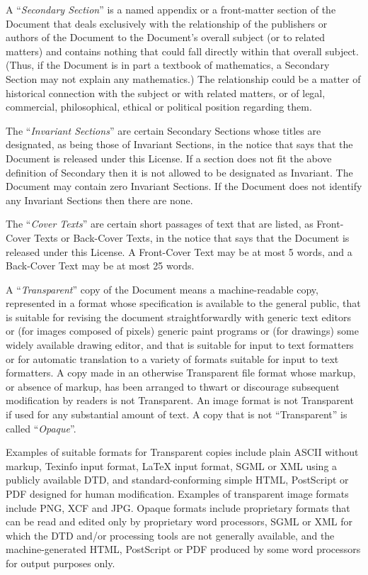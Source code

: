 \documentclass[a4paper,openany]{book}
\begin{document}
\begin{results}
A ``\emph{Secondary Section}'' is a named appendix or a front-matter section of
the Document that deals exclusively with the relationship of the
publishers or authors of the Document to the Document's overall subject
(or to related matters) and contains nothing that could fall directly
within that overall subject. (Thus, if the Document is in part a
textbook of mathematics, a Secondary Section may not explain any
mathematics.) The relationship could be a matter of historical
connection with the subject or with related matters, or of legal,
commercial, philosophical, ethical or political position regarding
them.

The ``\emph{Invariant Sections}'' are certain Secondary Sections whose titles
are designated, as being those of Invariant Sections, in the notice
that says that the Document is released under this License. If a
section does not fit the above definition of Secondary then it is not
allowed to be designated as Invariant. The Document may contain zero
Invariant Sections. If the Document does not identify any Invariant
Sections then there are none.

The ``\emph{Cover Texts}'' are certain short passages of text that are listed,
as Front-Cover Texts or Back-Cover Texts, in the notice that says that
the Document is released under this License. A Front-Cover Text may
be at most 5 words, and a Back-Cover Text may be at most 25 words.

A ``\emph{Transparent}'' copy of the Document means a machine-readable copy,
represented in a format whose specification is available to the
general public, that is suitable for revising the document
straightforwardly with generic text editors or (for images composed of
pixels) generic paint programs or (for drawings) some widely available
drawing editor, and that is suitable for input to text formatters or
for automatic translation to a variety of formats suitable for input
to text formatters. A copy made in an otherwise Transparent file
format whose markup, or absence of markup, has been arranged to thwart
or discourage subsequent modification by readers is not Transparent.
An image format is not Transparent if used for any substantial amount
of text. A copy that is not ``Transparent'' is called ``\emph{Opaque}''.

Examples of suitable formats for Transparent copies include plain
ASCII without markup, Texinfo input format, \LaTeX{} input format, SGML
or XML using a publicly available DTD, and standard-conforming simple
HTML, PostScript or PDF designed for human modification. Examples of
transparent image formats include PNG, XCF and JPG. Opaque formats
include proprietary formats that can be read and edited only by
proprietary word processors, SGML or XML for which the DTD and/or
processing tools are not generally available, and the
machine-generated HTML, PostScript or PDF produced by some word
processors for output purposes only.


\end{results}
\end{document}
